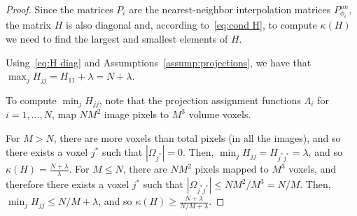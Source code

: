 \documentclass[10pt,a4paper]{amsart}
\begin{document}
\begin{proof}
    Since the matrices $P_i$ are the nearest-neighbor interpolation matrices
    $P_{\phi_i}^{nn}$, the matrix $H$ is also diagonal and, according to~\eqref{eq:cond H},
    to compute $\kappa(H)$ we need to find the largest and smallest elements of $H$. 

    Using~\eqref{eq:H diag} and Assumptions~\ref{assump:projections}, we have that
    $\max_{j} H_{jj} = H_{11} + \lambda = N+\lambda$.

    To compute $\min_{j} H_{jj}$, note that the projection assignment functions
    $\Lambda_i$ for $i=1,\ldots,N$, map $NM^2$ image pixels to $M^3$ volume voxels.

    For $M > N$, there are more voxels than total pixels (in all the
    images), and so there exists a voxel $j^*$ such that $|\Omega_{j^*}| = 0$. 
    Then, $\min_{j}H_{jj} = H_{j^* j^*} = \lambda$, 
    and so $\kappa(H) = \frac{N+\lambda}{\lambda}$.
    For $M \leq N$, there are $NM^2$ pixels mapped to $M^3$ voxels, and therefore
    there exists a voxel $j^*$ such that $|\Omega_{j^*j^*}| \leq NM^2/M^3 = N/M$.
    Then, $\min_j H_{jj} \leq N/M + \lambda$, and so
    $\kappa(H) \geq \frac{N+\lambda}{N/M + \lambda}$.
\end{proof}
\end{document}

